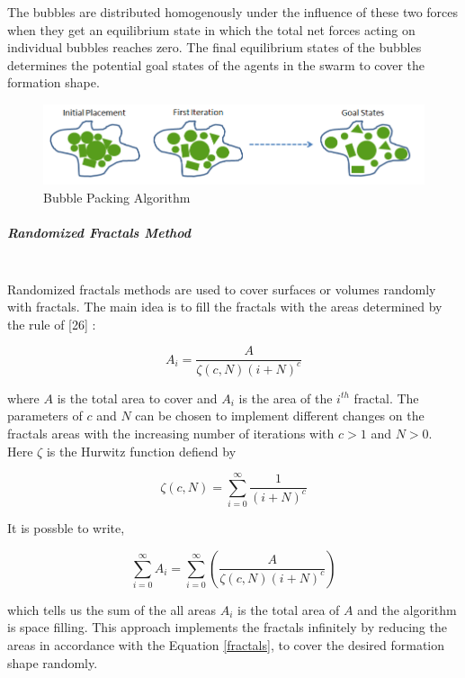 	
The bubbles are distributed homogenously under the influence of these two forces when they get an equilibrium state in which the total net forces acting on individual bubbles reaches zero. The final equilibrium states of the bubbles determines the potential goal states of the agents in the swarm to cover the formation shape. 

\begin{figure}[H]
\caption{Bubble Packing Algorithm}
\centering
\includegraphics[scale = 0.70]{bubble_packing2}
\end{figure}

\subparagraph{Randomized Fractals Method}\hspace{0pt} \\
Randomized fractals methods are used to cover surfaces or volumes randomly with fractals. The main idea is to fill the fractals with the areas determined by the rule of [26] :

\begin{equation} \label{fractals}
A_i = \frac{A}{\zeta(c,N)(i+N)^c}
\end{equation}

where $A$ is the total area to cover and $A_i$ is the area of the $i^{th}$ fractal. The parameters of $c$ and $N$ can be chosen to implement different changes on the fractals areas with the increasing number of iterations with $c>1$ and $N>0$. Here  $\zeta$ is the Hurwitz function defiend by

\begin{equation}
\zeta(c,N) = \sum_{i=0}^{\infty} \frac{1}{(i+N)^c}
\end{equation}

It is possble to write, 
	
\begin{equation}
\sum_{i=0}^{\infty}A_i = \sum_{i = 0}^{\infty}\left(\frac{A}{\zeta(c,N)(i+N)^c}\right)
\end{equation}
	
which tells us the sum of the all areas $A_i$ is the total area of $A$ and the algorithm is space filling. This approach implements the fractals infinitely by reducing the areas in accordance with the Equation \ref{fractals}, to cover the desired formation shape randomly. 

